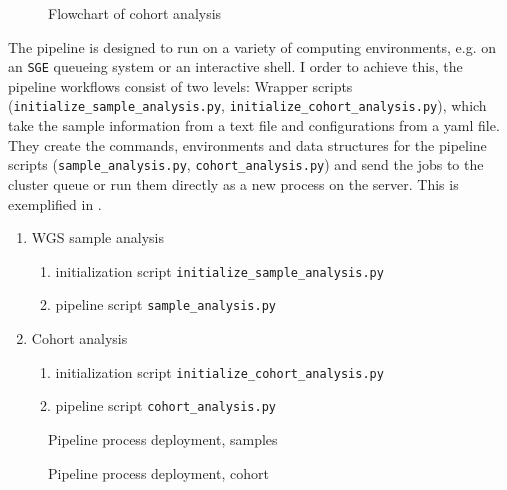 \documentclass[a4paper]{article}
\begin{document}
\begin{figure}
  \begin{center}
    
    \caption[cohort analysis]{Flowchart of cohort analysis}
  \label{fig:cohortAnalysis}
\end{center}
\end{figure}


The pipeline is designed to run on a variety of computing
environments, e.g. on an \texttt{SGE} queueing system or an
interactive shell. I order to achieve this, the pipeline workflows
consist of two levels: Wrapper scripts
(\texttt{initialize\_sample\_analysis.py},
\texttt{initialize\_cohort\_analysis.py}), which take the sample
information from a text file and configurations from a yaml file. They
create the commands, environments and data structures for the pipeline
scripts (\texttt{sample\_analysis.py}, \texttt{cohort\_analysis.py})
and send the jobs to the cluster queue or run them directly as a new
process on the server. This is exemplified in
.


\begin{enumerate}
\item WGS sample analysis
  \begin{enumerate}
  \item initialization script \texttt{initialize\_sample\_analysis.py}
  \item pipeline script \texttt{sample\_analysis.py}
  \end{enumerate}

\item Cohort analysis
  \begin{enumerate}
  \item initialization script \texttt{initialize\_cohort\_analysis.py}
  \item pipeline script \texttt{cohort\_analysis.py}
  \end{enumerate}

\end{enumerate}


\begin{figure}
  \begin{center}
    
    \caption[cohort analysis]{Pipeline process deployment, samples}
  \label{fig:pipelineProcess}
\end{center}
\end{figure}


\begin{figure}
  \begin{center}
    
    \caption[cohort analysis]{Pipeline process deployment, cohort}
  \label{fig:pipelineProcess}
\end{center}
\end{figure}
\end{document}
